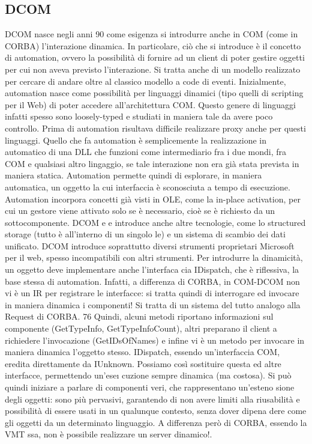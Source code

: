 \subsection{DCOM}
DCOM nasce negli anni 90 come esigenza si introdurre anche in COM (come
in CORBA) l'interazione dinamica. In particolare, ciò che si introduce è il
concetto di automation, ovvero la possibilità di fornire ad un client di poter
gestire oggetti per cui non aveva previsto l'interazione. Si tratta anche di un
modello realizzato per cercare di andare oltre al classico modello a code di eventi.
Inizialmente, automation nasce come possibilità per linguaggi dinamici (tipo
quelli di scripting per il Web) di poter accedere all'architettura COM. Questo
genere di linguaggi infatti spesso sono loosely-typed e studiati in maniera tale
da avere poco controllo. Prima di automation risultava difficile realizzare proxy
anche per questi linguaggi.
Quello che fa automation è semplicemente la realizzazione in automatico di
una DLL che funzioni come intermediario fra i due mondi, fra COM e qualsiasi
altro lingaggio, se tale interazione non era già stata prevista in maniera statica.
Automation permette quindi di esplorare, in maniera automatica, un oggetto
la cui interfaccia è sconosciuta a tempo di esecuzione. Automation incorpora
concetti già visti in OLE, come la in-place activation, per cui un gestore viene
attivato solo se è necessario, cioè se è richiesto da un sottocomponente. DCOM
e e
introduce anche altre tecnologie, come lo structured storage (tutto è all'interno
di un singolo le) e un sistema di scambio dei dati unificato. DCOM introduce
soprattutto diversi strumenti proprietari Microsoft per il web, spesso incompatibili con altri strumenti.
Per introdurre la dinamicità, un oggetto deve implementare anche l'interfaca
cia IDispatch, che è riflessiva, la base stessa di automation. Infatti, a differenza
di CORBA, in COM-DCOM non vi è un IR per registrare le interfacce: si tratta
quindi di interrogare ed invocare in maniera dinamica i componenti! Si tratta
di un sistema del tutto analogo alla Request di CORBA.
76
Quindi, alcuni metodi riportano informazioni sul componente (GetTypeInfo,
GetTypeInfoCount), altri preparano il client a richiedere l'invocazione (GetIDsOfNames) e infine vi è un metodo per
invocare in maniera dinamica l'oggetto
stesso. IDispatch, essendo un'interfaccia COM, eredita direttamente da IUnknown. Possiamo così sostituire questa ed
altre interfacce, permettendo un'ese\i{}
cuzione sempre dinamica (ma costosa).
Si può quindi iniziare a parlare di componenti veri, che rappresentano un'esteno
sione degli oggetti: sono più pervasivi, garantendo di non avere limiti alla riusabilità e possibilità di essere usati
in un qualunque contesto, senza dover dipena
dere come gli oggetti da un determinato linguaggio.
A differenza però di CORBA, essendo la VMT ssa, non è possibile realizzare
un server dinamico!.
